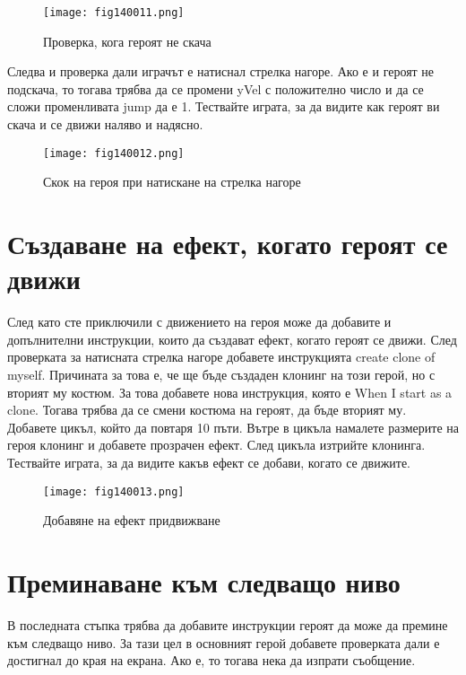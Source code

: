 \begin{figure}[H]
  \centering
  \texttt{[image: fig140011.png]}
  \caption{Проверка, кога героят не скача}
\label{fig140011}
\end{figure}

Следва и проверка дали играчът е натиснал стрелка нагоре. Ако е и героят не подскача, то тогава трябва да се промени yVel с положително число и да се сложи променливата jump да е 1. Тествайте играта, за да видите как героят ви скача и се движи наляво и надясно.

\begin{figure}[H]
  \centering
  \texttt{[image: fig140012.png]}
  \caption{Скок на героя при натискане на стрелка нагоре}
\label{fig140012}
\end{figure}

\section{Създаване на ефект, когато героят се движи}

След като сте приключили с движението на героя може да добавите и допълнителни инструкции, които да създават ефект, когато героят се движи. След проверката за натисната стрелка нагоре добавете инструкцията create clone of myself. Причината за това е, че ще бъде създаден клонинг на този герой, но с вторият му костюм. За това добавете нова инструкция, която е When I start as a clone. Тогава трябва да се смени костюма на героят, да бъде вторият му. Добавете цикъл, който да повтаря 10 пъти. Вътре в цикъла намалете размерите на героя клонинг и добавете прозрачен ефект. След цикъла изтрийте клонинга. Тествайте играта, за да видите какъв ефект се добави, когато се движите.

\begin{figure}[H]
  \centering
  \texttt{[image: fig140013.png]}
  \caption{Добавяне на ефект придвижване}
\label{fig140013}
\end{figure}

\section{Преминаване към следващо ниво}

В последната стъпка трябва да добавите инструкции героят да може да премине към следващо ниво. За тази цел в основният герой добавете проверката дали е достигнал до края на екрана. Ако е, то тогава нека да изпрати съобщение.

